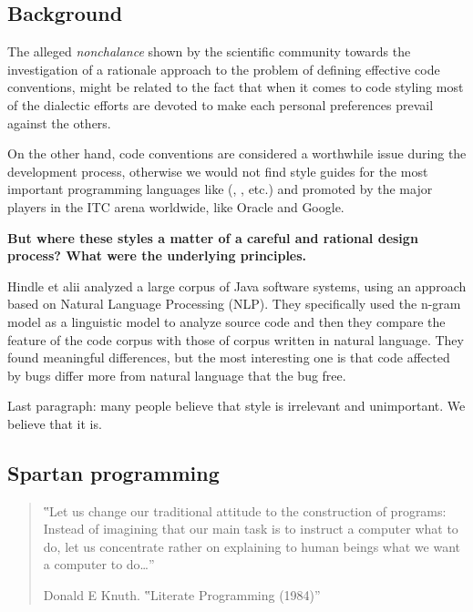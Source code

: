 
\subsection{Background}

The alleged \emph{nonchalance} shown by the scientific community towards the
investigation of a rationale approach to the problem of defining effective code
conventions, might be related to the fact that when it comes to code styling
most of the dialectic efforts are devoted to make each personal preferences 
prevail against the others.

On the other hand, code conventions are considered a worthwhile issue during
the development process, otherwise we would not find style guides for the most important
programming languages like (\Java, \CC, etc.) and promoted by the major players in
the ITC arena worldwide, like Oracle 
and Google.

\textbf{But where these styles a matter of a careful and rational design process?
What were the underlying principles.}

Hindle et alii \cite{Hindle:Bar:Su:Gabel:Devanbu:12} analyzed a large corpus of 
Java software systems, using an approach based on Natural Language Processing (NLP).
They specifically used the n-gram model as a linguistic model to analyze source code
and then they compare the feature of the code corpus with those of corpus
written in natural language. They found meaningful differences, but the most interesting
one is that code affected by bugs differ more from natural language that the bug free.

Last paragraph: many people believe that style is irrelevant and unimportant.
We believe that it is.

\subsection{Spartan programming}

\begin{quote}
  ‟Let us change our traditional attitude to the construction of programs:
  Instead of imagining that our main task is to instruct a computer what to do,
  let us concentrate rather on explaining to human beings what we want a computer
  to do…”
  \begin{flushright}
   \upshape Donald E Knuth. ‟Literate Programming (1984)”
  \end{flushright}
\end{quote}

